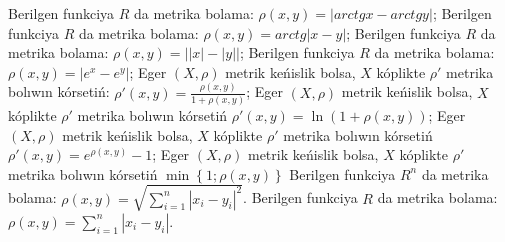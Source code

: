 Berilgen funkciya \(R\) da metrika bolama: \(\rho(x,y) = |arctgx - arctgy|\);
Berilgen funkciya \(R\) da metrika bolama: \(\rho(x,y) = arctg|x - y|\);
Berilgen funkciya \(R\) da metrika bolama: \(\rho(x,y) = \left| |x| - |y| \right|\);
Berilgen funkciya \(R\) da metrika bolama: \(\rho(x,y) = \left| e^{x} - e^{y} \right|\);
Eger \((X,\rho)\) metrik keńislik bolsa, \(X\) kóplikte \(\rho'\) metrika bolıwın kórsetiń: \(\rho'(x,y) = \frac{\rho(x,y)}{1 + \rho(x,y)}\);
Eger \((X,\rho)\) metrik keńislik bolsa, \(X\) kóplikte \(\rho'\) metrika bolıwın kórsetiń \(\rho'(x,y) = \ln\left( 1 + \rho(x,y) \right)\);
Eger \((X,\rho)\) metrik keńislik bolsa, \(X\) kóplikte \(\rho'\) metrika bolıwın kórsetiń \(\rho'(x,y) = e^{\rho(x,y)} - 1\);
Eger \((X,\rho)\) metrik keńislik bolsa, \(X\) kóplikte \(\rho'\) metrika bolıwın kórsetiń \(\min\left\{ 1;\rho(x,y) \right\}\)
Berilgen funkciya \(R^{n}\) da metrika bolama: \(\rho(x,y) = \sqrt{{\sum_{i = 1}^{n}\left| x_{i} - y_{i} \right|^{2}}}\).
Berilgen funkciya \(R\) da metrika bolama: \(\rho(x,y) = \sum_{i = 1}^{n}\left| x_{i} - y_{i} \right|\).